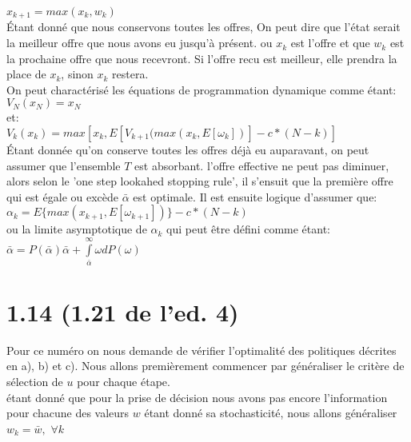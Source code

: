 \documentclass[oneside]{book}
\begin{document}
$x_{k+1} = max(x_k, w_k)$\\

Étant donné que nous conservons toutes les offres, On peut dire que l'état serait la meilleur offre que nous avons eu jusqu'à présent. ou $x_k$ est l'offre et que $w_k$ est la prochaine offre que nous recevront. Si l'offre recu est meilleur, elle prendra la place de $x_k$, sinon $x_k$ restera.\\

On peut charactérisé les équations de programmation dynamique comme étant:\\

$V_N(x_N) = x_N$\\

et:\\

$V_k(x_k) = max[x_k ,E[V_{k+1}(max(x_k,E[\omega_k])] - c*(N-k) ]$\\

Étant donnée qu'on conserve toutes les offres déjà eu auparavant, on peut assumer que l'ensemble $T$ est absorbant. l'offre effective ne peut pas diminuer, alors selon le 'one step lookahed stopping rule', il s'ensuit que la première offre qui est égale ou excède $\bar{\alpha}$ est optimale. Il est ensuite logique d'assumer que:\\

$\alpha_k = E\{max(x_{k+1},E[\omega_{k+1}])\} - c*(N-k)$\\

ou la limite asymptotique de $\alpha_k$ qui peut être défini comme étant:\\

$\bar{\alpha} = P(\bar{\alpha})\bar{\alpha} + \int\limits_{\bar{\alpha}}^{\infty}\omega dP(\omega)$


\section*{1.14 (1.21 de l'ed. 4)}
Pour ce numéro on nous demande de vérifier l'optimalité des politiques décrites en a), b) et c). Nous allons premièrement commencer par généraliser le critère de sélection de $u$ pour chaque étape.\\

étant donné que pour la prise de décision nous avons pas encore l'information pour chacune des valeurs $w$ étant donné sa stochasticité, nous allons généraliser $w_k = \bar{w},$   $ \forall k$
\end{document}
